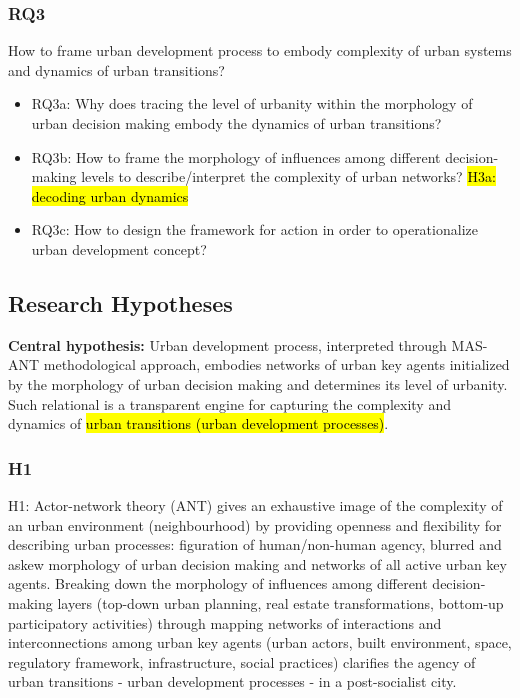 \documentclass[11pt]{report}
\begin{document}
\subsubsection{RQ3}
How to frame urban development process to embody complexity of urban systems and dynamics of urban transitions?
\begin{itemize}
\item RQ3a: Why does tracing the level of urbanity within the morphology of urban decision making embody the dynamics of urban transitions?
\item RQ3b: How to frame the morphology of influences among different decision-making levels to describe/interpret the complexity of urban networks?  \hl{H3a: decoding urban dynamics}
\item RQ3c: How to design the framework for action in order to operationalize urban development concept?
\end {itemize}

\subsection{Research Hypotheses}
\textbf{Central hypothesis:} Urban development process, interpreted through MAS-ANT methodological approach, embodies networks of urban key agents initialized by the morphology of urban decision making and determines its level of urbanity.
Such relational   is a transparent engine for capturing the complexity and dynamics of \hl{urban transitions (urban development processes)}. 

\subsubsection{H1}

H1: Actor-network theory (ANT) gives an exhaustive image of the complexity of an urban environment (neighbourhood) by providing openness and flexibility for describing urban processes: figuration of human/non-human agency, blurred and askew morphology of urban decision  making and networks of all active urban key agents.
Breaking  down  the morphology of influences among different decision-making layers (top-down urban planning, real estate transformations, bottom-up participatory activities) through mapping networks of interactions and interconnections among urban key agents (urban actors, built environment, space, regulatory framework, infrastructure, 
social practices) clarifies the agency of urban transitions - urban development processes - in a post-socialist city.
\end{document}
